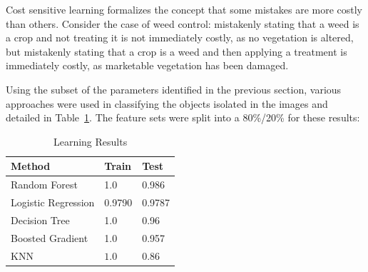 \documentclass[letterpaper]{article}
\begin{document}
{Cost sensitive learning formalizes the concept that some mistakes are more costly than others. Consider the case of weed control: mistakenly stating that a weed is a crop and not treating it is not immediately costly, as no vegetation is altered, but mistakenly stating that a crop is a weed and then applying a treatment is immediately costly, as marketable vegetation has been damaged.

Using the subset of the parameters identified in the previous section, various approaches were used in classifying the objects isolated in the images and detailed in Table~\ref{fig:learning}. The feature sets were split into a 80\%/20\% for these results: 

{\renewcommand{\arraystretch}{2}%
\begin{table}[H]
	\centering
    \caption{Learning Results}
    \label{fig:learning}
    \begin{tabular}{  l  p{4cm}  p{5cm} }
        \toprule
\textbf{Method}      
& \textbf{Train}   
& \textbf{Test} \\\midrule
Random Forest      
& 1.0
& 0.986 \\\hline
Logistic Regression
& 0.9790       
& 0.9787 \\\hline
Decision Tree
& 1.0
& 0.96 \\\hline
Boosted Gradient     
& 1.0
& 0.957 \\\hline
KNN     
& $1.0$                    
& $0.86$ \\\hline
        \bottomrule
    \end{tabular}
\end{table}

}}
\end{document}
